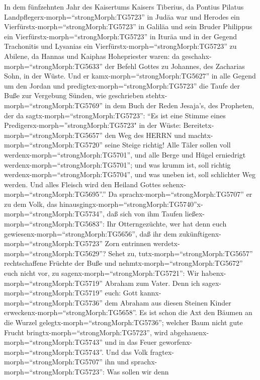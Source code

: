  In dem fünfzehnten Jahr des Kaisertums Kaisers Tiberius, da
Pontius Pilatus Landpflegerx-morph=``strongMorph:TG5723'' in Judäa war
und Herodes ein Vierfürstx-morph=``strongMorph:TG5723'' in Galiläa und
sein Bruder Philippus ein Vierfürstx-morph=``strongMorph:TG5723'' in
Ituräa und in der Gegend Trachonitis und Lysanias ein
Vierfürstx-morph=``strongMorph:TG5723'' zu Abilene,  da
Hannas und Kaiphas Hohepriester waren: da
geschahx-morph=``strongMorph:TG5633'' der Befehl Gottes zu Johannes, des
Zacharias Sohn, in der Wüste.  Und er
kamx-morph=``strongMorph:TG5627'' in alle Gegend um den Jordan und
predigtex-morph=``strongMorph:TG5723'' die Taufe der Buße zur Vergebung
Sünden,  wie geschrieben stehtx-morph=``strongMorph:TG5769''
in dem Buch der Reden Jesaja's, des Propheten, der da
sagtx-morph=``strongMorph:TG5723'': ``Es ist eine Stimme eines
Predigersx-morph=''strongMorph:TG5723" in der Wüste:
Bereitetx-morph=``strongMorph:TG5657'' den Weg des HERRN und
machtx-morph=``strongMorph:TG5720'' seine Steige richtig! 
Alle Täler sollen voll werdenx-morph=``strongMorph:TG5701'', und alle
Berge und Hügel erniedrigt werdenx-morph=``strongMorph:TG5701''; und was
krumm ist, soll richtig werdenx-morph=``strongMorph:TG5704'', und was
uneben ist, soll schlichter Weg werden.  Und alles Fleisch
wird den Heiland Gottes sehenx-morph=``strongMorph:TG5695''.''
 Da sprachx-morph=``strongMorph:TG5707'' er zu dem Volk, das
hinausgingx-morph=``strongMorph:TG5740''\textbar x-morph=``strongMorph:TG5734'',
daß sich von ihm Taufen ließex-morph=``strongMorph:TG5683'': Ihr
Otterngezüchte, wer hat denn euch
gewiesenx-morph=``strongMorph:TG5656'', daß ihr dem
zukünftigenx-morph=``strongMorph:TG5723'' Zorn entrinnen
werdetx-morph=``strongMorph:TG5629''?  Sehet zu,
tutx-morph=``strongMorph:TG5657'' rechtschaffene Früchte der Buße und
nehmtx-morph=``strongMorph:TG5672'' euch nicht vor, zu
sagenx-morph=``strongMorph:TG5721'': Wir
habenx-morph=``strongMorph:TG5719'' Abraham zum Vater. Denn ich
sagex-morph=``strongMorph:TG5719'' euch: Gott
kannx-morph=``strongMorph:TG5736'' dem Abraham aus diesen Steinen Kinder
erweckenx-morph=``strongMorph:TG5658''.  Es ist schon die
Axt den Bäumen an die Wurzel gelegtx-morph=``strongMorph:TG5736'';
welcher Baum nicht gute Frucht bringtx-morph=``strongMorph:TG5723'',
wird abgehauenx-morph=``strongMorph:TG5743'' und in das Feuer
geworfenx-morph=``strongMorph:TG5743''.  Und das Volk
fragtex-morph=``strongMorph:TG5707'' ihn und
sprachx-morph=``strongMorph:TG5723'': Was sollen wir denn
